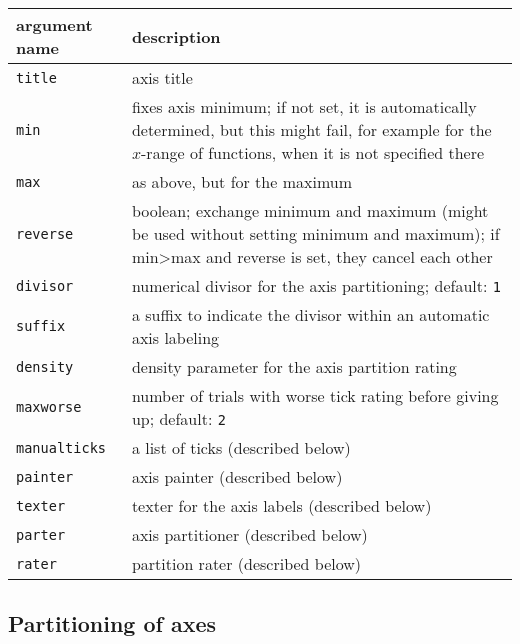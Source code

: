 \medskip
\begin{tabularx}{\linewidth}{l>{\raggedright\arraybackslash}X}
argument name&description\\
\hline
\texttt{title}&axis title\\
\texttt{min}&fixes axis minimum; if not set, it is automatically determined, but this might fail, for example for the $x$-range of functions, when it is not specified there\\
\texttt{max}&as above, but for the maximum\\
\texttt{reverse}&boolean; exchange minimum and maximum (might be used without setting minimum and maximum); if min>max and reverse is set, they cancel each other\\
\texttt{divisor}&numerical divisor for the axis partitioning; default: \texttt{1}\\
\texttt{suffix}&a suffix to indicate the divisor within an automatic axis labeling\\
\texttt{density}&density parameter for the axis partition rating\\
\texttt{maxworse}&number of trials with worse tick rating before giving up; default: \texttt{2}\\
\texttt{manualticks}&a list of ticks (described below)\\
\texttt{painter}&axis painter (described below)\\
\texttt{texter}&texter for the axis labels (described below)\\
\texttt{parter}&axis partitioner (described below)\\
\texttt{rater}&partition rater (described below)\\
\end{tabularx}
\medskip

\subsection{Partitioning of axes}

